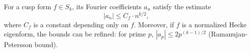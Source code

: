 For a cusp form $f \in S_k$, its Fourier coefficients $a_n$ satisfy the estimate
$$
|a_n| \leq C_f \cdot n^{k/2},
$$
where $C_f$ is a constant depending only on $f$. Moreover, if $f$ is a normalized Hecke eigenform, the bounds can be refined: for prime $p$, $|a_p| \leq 2p^{(k-1)/2}$ (Ramanujan-Petersson bound).
